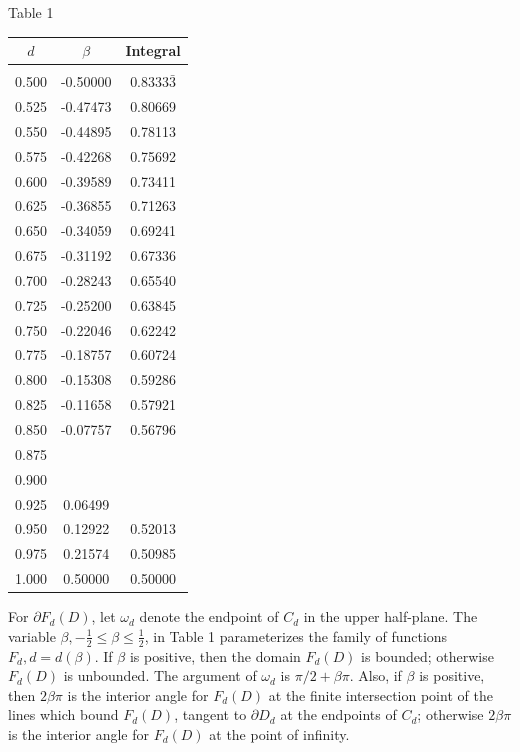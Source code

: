 \newpage

\begin{center}
Table 1\\[2ex]
\begin{tabular}{ccc}
$d$ & $\beta$ & Integral\\
\hline
\\
0.500 & -0.50000 & 0.8333$\bar{3}$ \\
0.525 & -0.47473 & 0.80669 \\
0.550 & -0.44895 & 0.78113\\
0.575 & -0.42268 & 0.75692 \\
0.600 & -0.39589 & 0.73411\\
0.625 & -0.36855 & 0.71263\\
0.650 & -0.34059 & 0.69241\\
0.675 & -0.31192 & 0.67336\\
0.700 & -0.28243 & 0.65540\\
0.725 & -0.25200 & 0.63845\\
0.750 & -0.22046 & 0.62242\\
0.775 & -0.18757 & 0.60724\\
0.800 & -0.15308 & 0.59286\\
0.825 & -0.11658 & 0.57921\\
0.850 & -0.07757 & 0.56796\\
0.875 & & \\
0.900 & & \\
0.925 & 0.06499 & \\
0.950 & 0.12922 & 0.52013\\
0.975 & 0.21574 & 0.50985\\
1.000 & 0.50000 & 0.50000
\end{tabular}
\end{center}


For $\partial F_d(D)$, let $\omega_d$ denote the endpoint of $C_d$ in
the upper half-plane.  The variable $\beta, -\frac{1}{2} \leq \beta
\leq \frac{1}{2}$, in Table 1 parameterizes the family of functions
$F_d, d=d(\beta)$.  If $\beta$ is positive, then the domain
$F_d(D)$ is bounded; otherwise $F_d(D)$ is unbounded.  The argument
of $\omega_d$ is $\pi/2+\beta \pi$.  Also, if $\beta$ is positive,
 then $2\beta\pi$ is
the interior angle for $F_d(D)$ at the finite intersection point of
the lines which bound $F_d(D)$, tangent to $\partial D_d$ at the
endpoints of $C_d$; otherwise $2\beta\pi$ is the interior angle for
$F_d(D)$ at the point of infinity.

